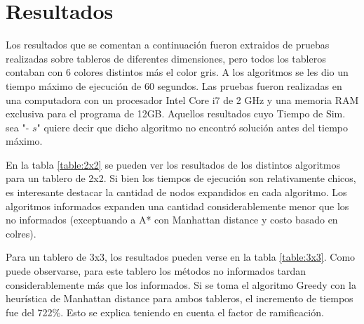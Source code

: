 \documentclass[11pt,twocolumn]{article}
\begin{document}
\section{Resultados}
    \par Los resultados que se comentan a continuación fueron extraidos de pruebas realizadas sobre tableros de diferentes dimensiones, pero todos los tableros contaban con 6 colores distintos más el color gris. A los algoritmos se les dio un tiempo máximo de ejecución de 60 segundos. Las pruebas fueron realizadas en una computadora con un procesador Intel Core i7 de 2 GHz y una memoria RAM exclusiva para el programa de 12GB. Aquellos resultados cuyo Tiempo de Sim. sea "- $s$" quiere decir que dicho algoritmo no encontró solución antes del tiempo máximo.
    \par En la tabla \ref{table:2x2} se pueden ver los resultados de los distintos algoritmos para un tablero de 2x2. Si bien los tiempos de ejecución son relativamente chicos, es interesante destacar la cantidad de nodos expandidos en cada algoritmo. Los algoritmos informados expanden una cantidad considerablemente menor que los no informados (exceptuando a A* con Manhattan distance y costo basado en colres).
    \par Para un tablero de 3x3, los resultados pueden verse en la tabla \ref{table:3x3}. Como puede observarse, para este tablero los métodos no informados tardan considerablemente más que los informados. Si se toma el algoritmo Greedy con la heurística de Manhattan distance para ambos tableros, el incremento de tiempos fue del 722\%. Esto se explica teniendo en cuenta el factor de ramificación.
\end{document}
